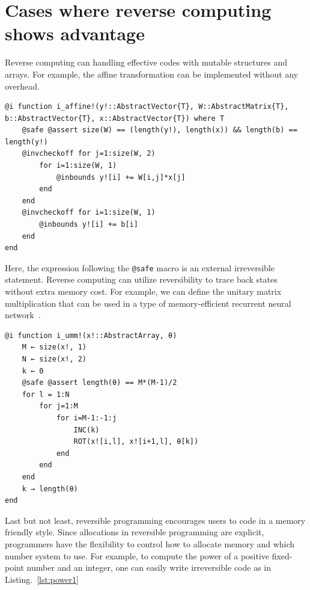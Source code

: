 \documentclass{article}
\newcommand{\<}{\langle}
\renewcommand{\>}{\rangle}
\newcommand{\Lst}[1]{Listing.~\ref{#1}}
\theoremstyle{definition}\newtheorem{definition}{\textit{Definition}}
\begin{document}
\section{Cases where reverse computing shows advantage}
Reverse computing can handling effective codes with mutable structures and arrays.
For example, the affine transformation can be implemented without any overhead.

\begin{minipage}{.88\columnwidth}
\begin{lstlisting}[mathescape=true,caption={Inplace affine transformation.},label={lst:affine}]
@i function i_affine!(y!::AbstractVector{T}, W::AbstractMatrix{T}, b::AbstractVector{T}, x::AbstractVector{T}) where T
    @safe @assert size(W) == (length(y!), length(x)) && length(b) == length(y!)
    @invcheckoff for j=1:size(W, 2)
        for i=1:size(W, 1)
            @inbounds y![i] += W[i,j]*x[j]
        end
    end
    @invcheckoff for i=1:size(W, 1)
        @inbounds y![i] += b[i]
    end
end
\end{lstlisting}
\end{minipage}

Here, the expression following the \texttt{@safe} macro is an external irreversible statement.
Reverse computing can utilize reversibility to trace back states without extra memory cost.
For example, we can define the unitary matrix multiplication that can be used in a type of memory-efficient recurrent neural network~\cite{Jing2016}.

\begin{minipage}{.88\columnwidth}
\begin{lstlisting}[mathescape=true,caption={Two level decomposition of a unitary matrix.},label={lst:affine}]
@i function i_umm!(x!::AbstractArray, θ)
    M ← size(x!, 1)
    N ← size(x!, 2)
    k ← 0
    @safe @assert length(θ) == M*(M-1)/2
    for l = 1:N
        for j=1:M
            for i=M-1:-1:j
                INC(k)
                ROT(x![i,l], x![i+1,l], θ[k])
            end
        end
    end
    k → length(θ)
end
\end{lstlisting}
\end{minipage}

Last but not least, reversible programming encourages users to code in a memory friendly style.
Since allocations in reversible programming are explicit, programmers have the flexibility to control how to allocate memory and which number system to use.
For example, to compute the power of a positive fixed-point number and an integer, one can easily write irreversible code as in \Lst{lst:power1}
\end{document}
